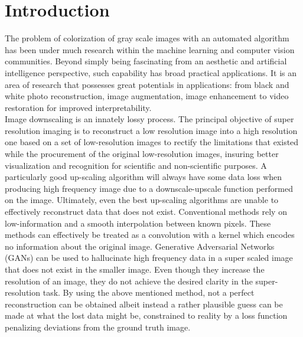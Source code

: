 \documentclass[10pt,twocolumn,letterpaper]{article}
\begin{document}
\section{Introduction}
\label{sec:intro}
The problem of colorization of gray scale images with an automated algorithm has been under much research within the machine learning and computer vision communities. Beyond simply being fascinating from an aesthetic and artificial intelligence perspective, such capability has broad practical applications. It is an area of research that possesses great potentials in applications: from black and white photo reconstruction, image augmentation, image enhancement to video restoration for improved interpretability. \\
\hspace*{0.167 in}Image downscaling is an innately lossy process. The principal objective of super resolution imaging is to reconstruct a low resolution image into a high resolution one based on a set of low-resolution images to rectify the limitations that existed while the procurement of the original low-resolution images, insuring better visualization and recognition for scientific and non-scientific purposes. A particularly good up-scaling algorithm will always have some data loss when producing high frequency image due to a downscale-upscale function performed on the image. Ultimately, even the best up-scaling algorithms are unable to effectively reconstruct data that does not exist. Conventional methods rely on low-information and a smooth interpolation between known pixels. These methods can effectively be treated as a convolution with a kernel which encodes no information about the original image. Generative Adversarial Networks (GANs) can be used to hallucinate high frequency data in a super scaled image that does not exist in the smaller image. Even though they increase the resolution of an image, they do not achieve the desired clarity in the super-resolution task. By using the above mentioned method, not a perfect reconstruction can be obtained albeit instead a rather plausible guess can be made at what the lost data might be, constrained to reality by a loss function penalizing deviations from the ground truth image.\\
\end{document}
